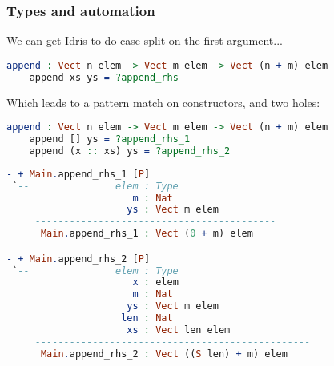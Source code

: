 \documentclass{beamer}
\begin{document}
\begin{frame}[fragile]
  \frametitle{Types and automation}

  We can get Idris to do case split on the first argument...

  \begin{lstlisting}[language=Idris]
    append : Vect n elem -> Vect m elem -> Vect (n + m) elem
    append xs ys = ?append_rhs      
  \end{lstlisting}

  \pause
  
  Which leads to a pattern match on constructors, and two holes:

  \begin{lstlisting}[language=Idris]
    append : Vect n elem -> Vect m elem -> Vect (n + m) elem
    append [] ys = ?append_rhs_1
    append (x :: xs) ys = ?append_rhs_2
  \end{lstlisting}

  \pause

  \begin{lstlisting}[language=Idris]
- + Main.append_rhs_1 [P]
 `--               elem : Type
                      m : Nat
                     ys : Vect m elem
     ------------------------------------------
      Main.append_rhs_1 : Vect (0 + m) elem

- + Main.append_rhs_2 [P]
 `--               elem : Type
                      x : elem
                      m : Nat
                     ys : Vect m elem
                    len : Nat
                     xs : Vect len elem
     ------------------------------------------------
      Main.append_rhs_2 : Vect ((S len) + m) elem
  \end{lstlisting}
\end{frame}
\end{document}

